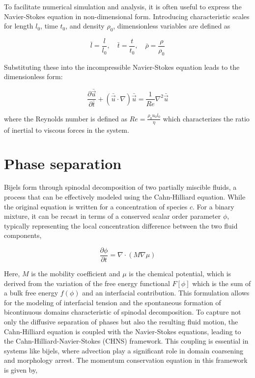 To facilitate numerical simulation and analysis, it is often useful to express the Navier-Stokes equation in non-dimensional form. Introducing characteristic scales for length 
$l_0$, time $t_0$, and density $\rho_0$, dimensionless variables are defined as

\begin{equation}
    \bar{l} = \frac{l}{l_0}, \quad \bar{t} = \frac{t}{t_0}, \quad \bar{\rho} = \frac{\rho}{\rho_0}
\end{equation}

Substituting these into the incompressible Navier-Stokes equation leads to the dimensionless form:

\begin{equation}
    \frac{\partial \bar{\vec{u}}}{\partial \bar{t}} + (\bar{\vec{u}} \cdot\nabla)\bar{\vec{u}} = \frac{1}{Re} \nabla^2 \bar{\vec{u}}
\end{equation}

where the Reynolds number is defined as $Re = \frac{\rho_0 u_0 l_0}{\eta}$ which characterizes the ratio of inertial to viscous forces in the system.

\section{Phase separation}

Bijels form through spinodal decomposition of two partially miscible fluids, a process that can be effectively modeled using the Cahn-Hilliard equation. \cite{cahn_spinodal_1961} While the
original equation is written for a concentration of species $c$. For a binary mixture, it can be recast in terms of a conserved scalar order parameter $\phi$, typically representing the 
local concentration difference between the two fluid components,

\begin{equation}
    \frac{\partial \phi}{\partial t} = \nabla \cdot \left( M \nabla \mu \right)
\end{equation}

Here, $M$ is the mobility coefficient and $\mu$ is the chemical potential, which is derived from the variation of the free energy functional $F[\phi]$ which is the sum of a bulk free energy
$f(\phi)$ and an interfacial contribution. This formulation allows for the modeling of 
interfacial tension and the spontaneous formation of bicontinuous domains characteristic of spinodal decomposition.
To capture not only the diffusive separation of phases but also the resulting fluid motion, the Cahn-Hilliard equation is coupled with the Navier-Stokes equations, leading to the 
Cahn-Hilliard-Navier-Stokes (CHNS) framework. This coupling is essential in systems like bijels, where advection play a significant role in domain coarsening and morphology arrest. 
The momentum conservation equation in this framework is given by,

